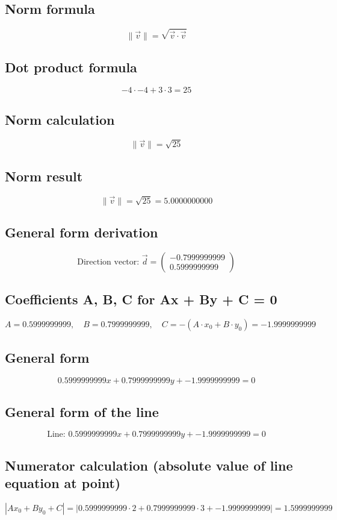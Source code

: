 \documentclass{article}
\begin{document}
\subsection*{ \vspace{1em} Norm formula}
\[
\|\vec{v}\| = \sqrt{\vec{v} \cdot \vec{v}}
\]
\subsection*{ \vspace{1em} Dot product formula}
\[
-4 \cdot -4 + 3 \cdot 3 = 25
\]
\subsection*{ \vspace{1em} Norm calculation}
\[
\|\vec{v}\| = \sqrt{25}
\]
\subsection*{ \vspace{1em} Norm result}
\[
\|\vec{v}\| = \sqrt{25} = 5.0000000000
\]
\subsection*{ \vspace{1em} General form derivation}
\[
\text{Direction vector: } \vec{d} = \begin{pmatrix}-0.7999999999 \\ 0.5999999999\end{pmatrix}
\]
\subsection*{ \vspace{1em} Coefficients A, B, C for Ax + By + C = 0}
\[
A = 0.5999999999,\quad B = 0.7999999999,\quad C = - (A \cdot x_0 + B \cdot y_0) = -1.9999999999
\]
\subsection*{ \vspace{1em} General form}
\[
0.5999999999x + 0.7999999999y + -1.9999999999 = 0
\]
\subsection*{ \vspace{1em} General form of the line}
\[
\text{Line: } 0.5999999999x + 0.7999999999y + -1.9999999999 = 0
\]
\subsection*{ \vspace{1em} Numerator calculation (absolute value of line equation at point)}
\[
\left| A x_0 + B y_0 + C \right| = \left| 0.5999999999 \cdot 2 + 0.7999999999 \cdot 3 + -1.9999999999 \right| = 1.5999999999
\]
\end{document}
